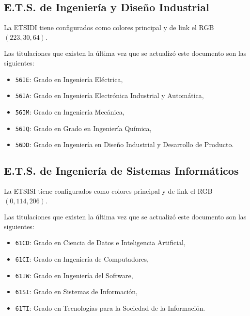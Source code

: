 \documentclass[%
    school=etsisi,%
    type=pfg,%
    degree=61CI,%
]{upm-report}
\begin{document}
\subsection{E.T.S. de Ingeniería y Diseño Industrial}

La ETSIDI tiene configurados como colores principal y de link el RGB $(223,30,64)$.

Las titulaciones que existen la última vez que se actualizó este documento son las siguientes:

\begin{itemize}
    \item \texttt{56IE}: Grado en Ingeniería Eléctrica,
    \item \texttt{56IA}: Grado en Ingeniería Electrónica Industrial y Automática,
    \item \texttt{56IM}: Grado en Ingeniería Mecánica,
    \item \texttt{56IQ}: Grado en Grado en Ingeniería Química,
    \item \texttt{56DD}: Grado en Ingeniería en Diseño Industrial y Desarrollo de Producto.
\end{itemize}

\subsection{E.T.S. de Ingeniería de Sistemas Informáticos}

La ETSISI tiene configurados como colores principal y de link el RGB $(0,114,206)$.

Las titulaciones que existen la última vez que se actualizó este documento son las siguientes:

\begin{itemize}
    \item \texttt{61CD}: Grado en Ciencia de Datos e Inteligencia Artificial,
    \item \texttt{61CI}: Grado en Ingeniería de Computadores,
    \item \texttt{61IW}: Grado en Ingeniería del Software,
    \item \texttt{61SI}: Grado en Sistemas de Información,
    \item \texttt{61TI}: Grado en Tecnologías para la Sociedad de la Información.
\end{itemize}
\end{document}
